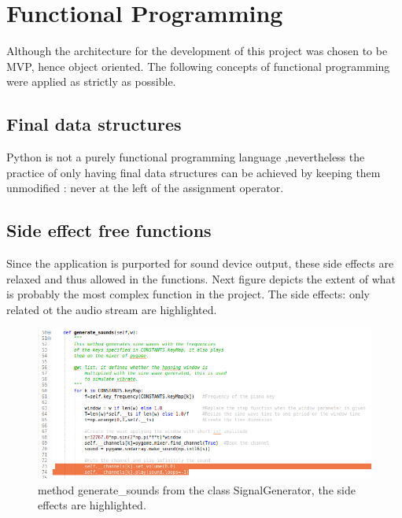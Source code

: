 \documentclass[margin,line,a4paper,authoryear,12pt]{report}
\begin{document}
\chapter{Functional Programming}
Although the architecture for the development of this project was chosen to be MVP, hence
object oriented. The following concepts of functional programming were applied as strictly as possible.
\section{Final data structures}
Python is not a purely functional programming language ,nevertheless the 
practice of only having final data structures can be achieved by keeping them unmodified : 
never at the left of the assignment operator\cite{pythonFunctional}.

\section{Side effect free functions}
Since the application is purported for sound device output, these side effects
are relaxed and thus allowed in the functions. Next figure depicts the extent of what is probably the most
complex function in the project. The side effects: only related ot the audio stream are highlighted.
\begin{figure}[h!]
    \centering
    \includegraphics[width=\linewidth]{Side_effects.png}
    \caption{ method generate\_sounds from the class SignalGenerator, the side effects are highlighted.}
    \label{fig:aspects}
\end{figure}
\end{document}
